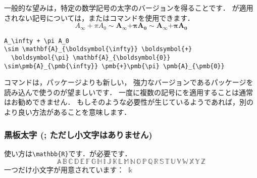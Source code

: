 一般的な望みは，特定の数学記号の太字のバージョンを得ることです．
が適用されない記号については，またはコマンドを使用できます．
\begin{equation}
A_\infty + \pi A_0
\sim \mathbf{A}_{\boldsymbol{\infty}} \boldsymbol{+}
  \boldsymbol{\pi} \mathbf{A}_{\boldsymbol{0}}
\sim\pmb{A}_{\pmb{\infty}} \pmb{+}\pmb{\pi} \pmb{A}_{\pmb{0}}
\end{equation}
\begin{verbatim}
A_\infty + \pi A_0
\sim \mathbf{A}_{\boldsymbol{\infty}} \boldsymbol{+}
  \boldsymbol{\pi} \mathbf{A}_{\boldsymbol{0}}
\sim\pmb{A}_{\pmb{\infty}} \pmb{+}\pmb{\pi} \pmb{A}_{\pmb{0}}
\end{verbatim}
コマンドは，パッケージよりも新しい，
強力なバージョンであるパッケージを読み込んで使うのが望ましいです．
一度に複数の記号にを適用することは通常はお勧めできません．
もしそのような必要性が生じているようであれば，別のより良い方法があることを意味します．
\subsubsection{黒板太字 (; ただし小文字はありません)}
使い方は\verb'\mathbb{R}'です．が必要です．
\[
\mathbb{A}\,\mathbb{B}\,\mathbb{C}\,\mathbb{D}\,\mathbb{E}\,\mathbb{F}
\,\mathbb{G}\,\mathbb{H}\,\mathbb{I}\,\mathbb{J}\,\mathbb{K}\,\mathbb{L}
\,\mathbb{M}\,\mathbb{N}\,\mathbb{O}\,\mathbb{P}\,\mathbb{Q}\,\mathbb{R}
\,\mathbb{S}\,\mathbb{T}\,\mathbb{U}\,\mathbb{V}\,\mathbb{W}\,\mathbb{X}
\,\mathbb{Y}\,\mathbb{Z}
\]
一つだけ小文字が用意されています：\qquad
$\Bbbk$\quad {}

